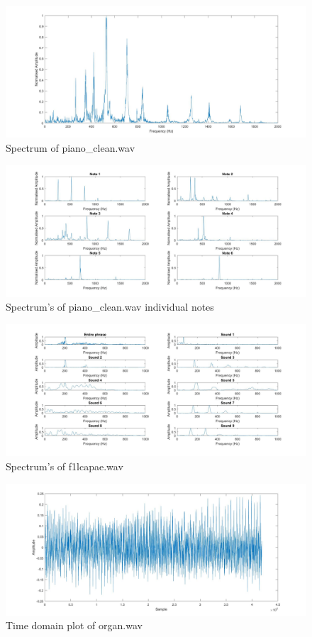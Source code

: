 \documentclass[10.9pt]{article}
\begin{document}
\begin{figure} [H]
\centering	\includegraphics[scale = 0.2]
{Piano_OG}
\caption{Spectrum of piano\_clean.wav}
\label{Piano_OG}
\end{figure}

\begin{figure} [H]
\centering	\includegraphics[scale = 0.3]
{Piano}
\caption{Spectrum's of piano\_clean.wav individual notes}
\label{Piano}
\end{figure}

\begin{figure} [H]
\centering	\includegraphics[scale = 0.3]
{Speech}
\caption{Spectrum's of f1lcapae.wav}
\label{Speech}
\end{figure}

\begin{figure} [H]
\centering	\includegraphics[scale = 0.3]
{Organ_time}
\caption{Time domain plot of organ.wav}
\label{Organ_time}
\end{figure}
\end{document}
